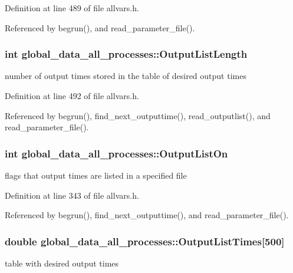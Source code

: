 Definition at line 489 of file allvars.h.



Referenced by begrun(), and read\_\-parameter\_\-file().

\hypertarget{structglobal__data__all__processes_af0ada535a17b75233e0e0de6ff8fa448}{
\subsubsection[{OutputListLength}]{\setlength{\rightskip}{0pt plus 5cm}int {\bf global\_\-data\_\-all\_\-processes::OutputListLength}}}
\label{structglobal__data__all__processes_af0ada535a17b75233e0e0de6ff8fa448}
number of output times stored in the table of desired output times 

Definition at line 492 of file allvars.h.



Referenced by begrun(), find\_\-next\_\-outputtime(), read\_\-outputlist(), and read\_\-parameter\_\-file().

\hypertarget{structglobal__data__all__processes_a4e9d69a3dd88c6aef6f4afd640243950}{
\subsubsection[{OutputListOn}]{\setlength{\rightskip}{0pt plus 5cm}int {\bf global\_\-data\_\-all\_\-processes::OutputListOn}}}
\label{structglobal__data__all__processes_a4e9d69a3dd88c6aef6f4afd640243950}
flags that output times are listed in a specified file 

Definition at line 343 of file allvars.h.



Referenced by begrun(), find\_\-next\_\-outputtime(), and read\_\-parameter\_\-file().

\hypertarget{structglobal__data__all__processes_a7f3307450336a806e545661ba6c79ba5}{
\subsubsection[{OutputListTimes}]{\setlength{\rightskip}{0pt plus 5cm}double {\bf global\_\-data\_\-all\_\-processes::OutputListTimes}\mbox{[}500\mbox{]}}}
\label{structglobal__data__all__processes_a7f3307450336a806e545661ba6c79ba5}
table with desired output times 

